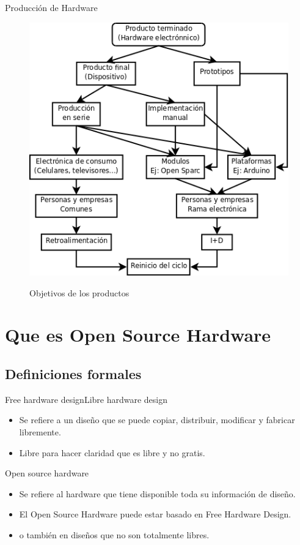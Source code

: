 \documentclass{beamer}
\begin{document}
\begin{frame}{Producción de Hardware}
  \begin{figure}
    \includegraphics[scale=0.3]{img/objetivos}
    \label{fig:objetivos}
    \caption{Objetivos de los productos}
  \end{figure}
\end{frame}
 
\section{Que es Open Source Hardware}
\subsection{Definiciones formales}

\begin{frame}{Free hardware design}{Libre hardware design}
  \begin{itemize}
  \item Se refiere a un diseño que se puede copiar, distribuir, modificar y fabricar libremente.
  \item Libre para hacer claridad que es libre y no gratis.
  \end{itemize}
\end{frame}

\begin{frame}{Open source hardware}
  \begin{itemize}
  \item Se refiere al hardware que tiene disponible toda su información de diseño.
  \item El Open Source Hardware puede estar basado en Free Hardware Design.
  \item o también en diseños que no son totalmente libres.
  \end{itemize}
\end{frame}
\end{document}
